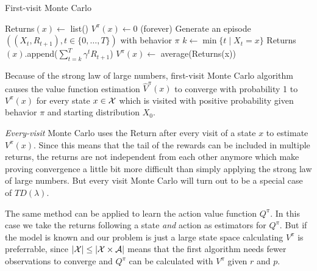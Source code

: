 \begin{algorithm}
	\caption{First-visit Monte Carlo}
	\begin{algorithmic}[1]
		 
			\State Returns\((x)\gets\) list()
			\State \(V^\pi(x)\gets 0\)
		\EndFor
		 (forever) 
			\State Generate an episode \(((X_t,R_{t+1}), t\in\{0,\dots,T\})\) with behavior \(\pi\)
				\State \(k\gets \min\{t \mid X_t=x\}\)
				\State Returns\((x)\).append(\(\sum_{t=k}^T\gamma^tR_{t+1}\))
				\State \(V^\pi(x)\gets\) average(Returns(x))
			\EndFor
		\EndWhile
	\end{algorithmic}
\end{algorithm}

Because of the strong law of large numbers, first-visit Monte Carlo algorithm causes the value function estimation \(\hat{V}^\pi(x)\) to converge with probability 1 to \(V^\pi(x)\) for every state \(x\in\mathcal{X}\) which is visited with positive probability given behavior \(\pi\) and starting distribution \(X_0\). 

\emph{Every-visit} Monte Carlo uses the Return after every visit of a state \(x\) to estimate \(V^\pi(x)\). Since this means that the tail of the rewards can be included in multiple returns, the returns are not independent from each other anymore which make proving convergence a little bit more difficult than simply applying the strong law of large numbers. But every visit Monte Carlo will turn out to be a special case of \(TD(\lambda)\). 

The same method can be applied to learn the action value function \(Q^\pi\). In this case we take the returns following a state \emph{and} action as estimators for \(Q^\pi\). But if the model is known and our problem is just a large state space calculating \(V^\pi\) is preferrable, since \(|\mathcal{X}|\le |\mathcal{X}\times\mathcal{A}|\) means that the first algorithm needs fewer observations to converge and \(Q^\pi\) can be calculated with \(V^\pi\) given \(r\) and \(p\).

